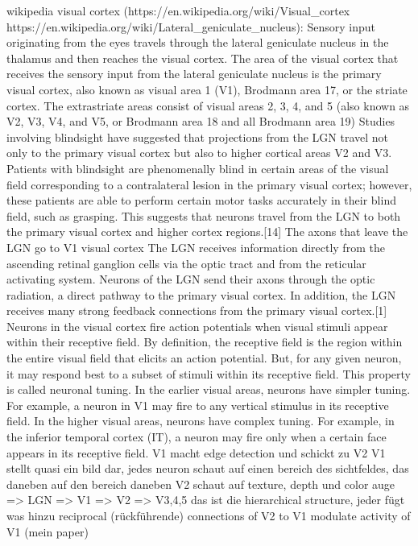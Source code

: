wikipedia visual cortex (https://en.wikipedia.org/wiki/Visual_cortex
https://en.wikipedia.org/wiki/Lateral_geniculate_nucleus):
 Sensory input originating from the eyes travels through the lateral geniculate nucleus in the thalamus and then reaches the visual cortex. The area of the visual cortex that receives the sensory input from the lateral geniculate nucleus is the primary visual cortex, also known as visual area 1 (V1), Brodmann area 17, or the striate cortex. The extrastriate areas consist of visual areas 2, 3, 4, and 5 (also known as V2, V3, V4, and V5, or Brodmann area 18 and all Brodmann area 19)
 Studies involving blindsight have suggested that projections from the LGN travel not only to the primary visual cortex but also to higher cortical areas V2 and V3. Patients with blindsight are phenomenally blind in certain areas of the visual field corresponding to a contralateral lesion in the primary visual cortex; however, these patients are able to perform certain motor tasks accurately in their blind field, such as grasping. This suggests that neurons travel from the LGN to both the primary visual cortex and higher cortex regions.[14]
The axons that leave the LGN go to V1 visual cortex
The LGN receives information directly from the ascending retinal ganglion cells via the optic tract and from the reticular activating system. Neurons of the LGN send their axons through the optic radiation, a direct pathway to the primary visual cortex. In addition, the LGN receives many strong feedback connections from the primary visual cortex.[1]
 Neurons in the visual cortex fire action potentials when visual stimuli appear within their receptive field.
By definition, the receptive field is the region within the entire visual field that elicits an action potential. But, for any given neuron, it may respond best to a subset of stimuli within its receptive field. This property is called neuronal tuning. In the earlier visual areas, neurons have simpler tuning. For example, a neuron in V1 may fire to any vertical stimulus in its receptive field. In the higher visual areas, neurons have complex tuning. For example, in the inferior temporal cortex (IT), a neuron may fire only when a certain face appears in its receptive field.
V1 macht edge detection und schickt zu V2
V1 stellt quasi ein bild dar, jedes neuron schaut auf einen bereich des sichtfeldes, das daneben auf den bereich daneben
V2 schaut auf texture, depth und color
auge => LGN => V1 => V2 => V3,4,5
das ist die hierarchical structure, jeder fügt was hinzu
 reciprocal (rückführende) connections of V2 to V1 modulate activity of V1 (mein paper)

